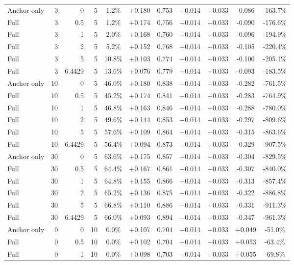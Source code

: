 \begin{table}[htbp]
\begin{tabular}{lrrrccccccc}
Anchor only & 3 & 0 & 5 & 1.2\% & +0.180 & 0.753 & +0.014 & +0.033 & -0.086 & -163.7\% \\
Full & 3 & 0.5 & 5 & 1.2\% & +0.174 & 0.756 & +0.014 & +0.033 & -0.090 & -176.6\% \\
Full & 3 & 1 & 5 & 2.0\% & +0.168 & 0.760 & +0.014 & +0.033 & -0.096 & -194.9\% \\
Full & 3 & 2 & 5 & 5.2\% & +0.152 & 0.768 & +0.014 & +0.033 & -0.105 & -220.4\% \\
Full & 3 & 5 & 5 & 10.8\% & +0.103 & 0.774 & +0.014 & +0.033 & -0.100 & -205.1\% \\
Full & 3 & 6.4429 & 5 & 13.6\% & +0.076 & 0.779 & +0.014 & +0.033 & -0.093 & -183.5\% \\
Anchor only & 10 & 0 & 5 & 46.0\% & +0.180 & 0.838 & +0.014 & +0.033 & -0.282 & -761.5\% \\
Full & 10 & 0.5 & 5 & 45.2\% & +0.174 & 0.841 & +0.014 & +0.033 & -0.283 & -764.9\% \\
Full & 10 & 1 & 5 & 46.8\% & +0.163 & 0.846 & +0.014 & +0.033 & -0.288 & -780.0\% \\
Full & 10 & 2 & 5 & 49.6\% & +0.144 & 0.853 & +0.014 & +0.033 & -0.297 & -809.6\% \\
Full & 10 & 5 & 5 & 57.6\% & +0.109 & 0.864 & +0.014 & +0.033 & -0.315 & -863.6\% \\
Full & 10 & 6.4429 & 5 & 56.4\% & +0.094 & 0.873 & +0.014 & +0.033 & -0.329 & -907.5\% \\
Anchor only & 30 & 0 & 5 & 63.6\% & +0.175 & 0.857 & +0.014 & +0.033 & -0.304 & -829.5\% \\
Full & 30 & 0.5 & 5 & 64.4\% & +0.167 & 0.861 & +0.014 & +0.033 & -0.307 & -840.0\% \\
Full & 30 & 1 & 5 & 64.8\% & +0.155 & 0.866 & +0.014 & +0.033 & -0.313 & -857.4\% \\
Full & 30 & 2 & 5 & 65.2\% & +0.136 & 0.875 & +0.014 & +0.033 & -0.322 & -886.8\% \\
Full & 30 & 5 & 5 & 66.8\% & +0.110 & 0.886 & +0.014 & +0.033 & -0.331 & -911.3\% \\
Full & 30 & 6.4429 & 5 & 66.0\% & +0.093 & 0.894 & +0.014 & +0.033 & -0.347 & -961.3\% \\
Anchor only & 0 & 0 & 10 & 0.0\% & +0.107 & 0.704 & +0.014 & +0.033 & +0.049 & -51.0\% \\
Full & 0 & 0.5 & 10 & 0.0\% & +0.102 & 0.704 & +0.014 & +0.033 & +0.053 & -63.4\% \\
Full & 0 & 1 & 10 & 0.0\% & +0.098 & 0.703 & +0.014 & +0.033 & +0.055 & -69.8\% \\

\end{tabular}
\end{table}
